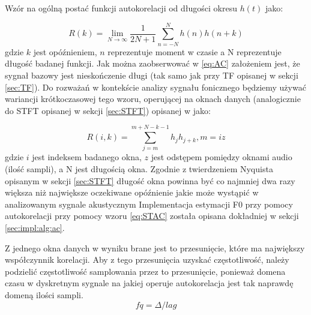 \documentclass[12pt,a4paper,twoside]{mwart}
\begin{document}
Wzór na ogólną postać funkcji autokorelacji od długości okresu $h(t)$ jako:

\begin{equation}\label{eq:AC}
  R(k) = \lim_{N \to \infty} \frac{1}{2N + 1} \sum_{n=-N}^{N} h(n)h(n + k)
\end{equation}
gdzie $k$ jest opóźnieniem, $n$ reprezentuje moment w czasie a N reprezentuje długość badanej funkcji. Jak można zaobserwować w \ref{eq:AC} założeniem jest, że sygnał bazowy jest nieskończenie długi (tak samo jak przy TF opisanej w sekcji \ref{sec:TF}). Do rozważań w kontekście analizy sygnału fonicznego będziemy używać wariancji krótkoczasowej tego wzoru, operującej na oknach danych (analogicznie do STFT opisanej w sekcji \ref{sec:STFT}) opisanej w \cite{Transcription:Talkin:RAPT} jako:

\begin{equation}\label{eq:STAC}
  R(i,k) = \sum_{j=m}^{m + N - k - 1} h_jh_{j+k}, m = iz
\end{equation}
gdzie $i$ jest indeksem badanego okna, $z$ jest odstępem pomiędzy oknami audio (ilość sampli), a N jest długością okna. Zgodnie z twierdzeniem Nyquista opisanym w sekcji \ref{sec:STFT} długość okna powinna być co najmniej dwa razy większa niż największe oczekiwane opóźnienie jakie może wystąpić w analizowanym sygnale akustycznym Implementacja estymacji F0 przy pomocy autokorelacji przy pomocy wzoru \ref{eq:STAC} została opisana dokładniej w sekcji \ref{sec:impl:alg:ac}.

Z jednego okna danych w wyniku brane jest to przesunięcie, które ma największy współczynnik korelacji. Aby z tego przesunięcia uzyskać częstotliwość, należy podzielić częstotliwość samplowania przez to przesunięcie, ponieważ domena czasu w dyskretnym sygnale na jakiej operuje autokorelacja jest tak naprawdę domeną ilości sampli.
\begin{equation}\label{eq:AC:hz}
  fq = \Delta/lag
\end{equation}
\end{document}
